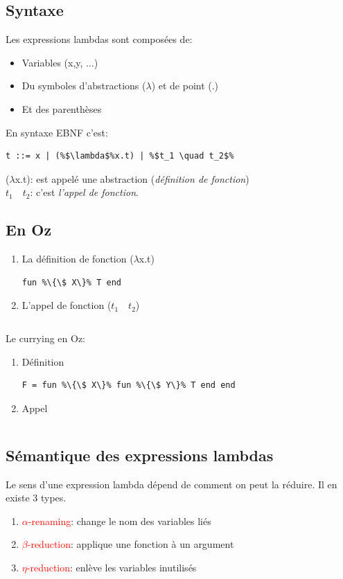 \documentclass{report}
\begin{document}
\subsection{Syntaxe}
Les expressions lambdas sont composées de:
\begin{itemize}
\item Variables (x,y, ...)
\item Du symboles d'abstractions ($\lambda$) et de point (.)
\item Et des parenthèses
\end{itemize}
En syntaxe EBNF c'est:
\begin{lstlisting}[escapechar=\%]
t ::= x | (%$\lambda$%x.t) | %$t_1 \quad t_2$%
\end{lstlisting}
($\lambda$x.t): est appelé une abstraction (\textit{définition de fonction})\\
$t_1 \quad t_2$: c'est \textit{l'appel de fonction}.

\subsection{En Oz}
\begin{enumerate}
\item La définition de fonction ($\lambda$x.t)
\begin{lstlisting}[escapechar=\%]
fun %\{\$ X\}% T end
\end{lstlisting}
\item L'appel de fonction ($t_1 \quad t_2$)
\begin{lstlisting}[escapechar=\%]
%\{$T_1 \quad T_2$\}%
\end{lstlisting}
\end{enumerate}
Le currying en Oz:
\begin{enumerate}
\item Définition
\begin{lstlisting}[escapechar=\%]
F = fun %\{\$ X\}% fun %\{\$ Y\}% T end end
\end{lstlisting}
\item Appel
\begin{lstlisting}[escapechar=\%]
%\{\{F X\} Y\}%
\end{lstlisting}
\end{enumerate}

\subsection{Sémantique des expressions lambdas}
Le sens d'une expression lambda dépend de comment on peut la réduire. Il en existe 3 types.
\begin{enumerate}
\item \textcolor{red}{$\alpha$-renaming}: change le nom des variables liés
\item \textcolor{red}{$\beta$-reduction}: applique une fonction à un argument
\item \textcolor{red}{$\eta$-reduction}: enlève les variables inutilisés
\end{enumerate}
\end{document}
